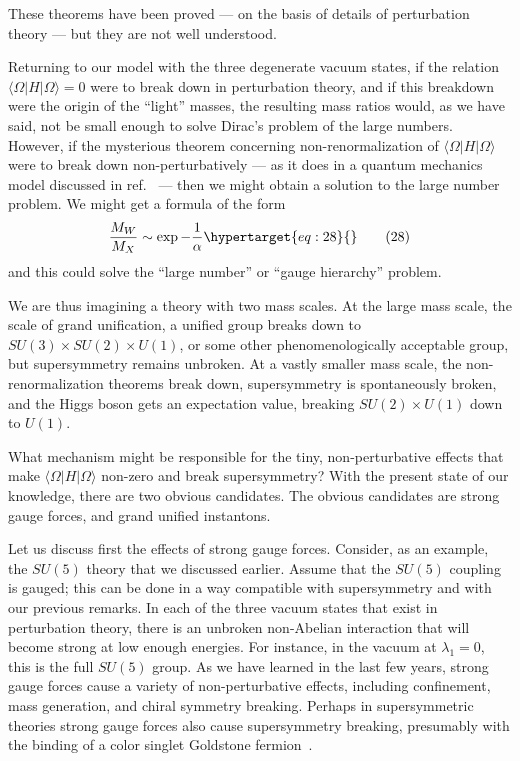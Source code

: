 \documentclass[11pt,a4paper]{article}
\newcommand{\eqtarget}[1]{\hypertarget{eq:#1}{\mathstrut}\tag{#1}}
\begin{document}
These theorems have been proved --- on the basis of details of
perturbation theory --- but they are not well understood.

Returning to our model with the three degenerate vacuum states,
if the relation $\langle \Omega| H |\Omega \rangle = 0$ were to break down in perturbation
theory, and if this breakdown were the origin of the ``light'' masses,
the resulting mass ratios would, as we have said, not be small enough
to solve Dirac's problem of the large numbers. However, if the mysterious
theorem concerning non-renormalization of $\langle \Omega| H |\Omega \rangle$ were to
break down non-perturbatively --- as it does in a quantum mechanics
model discussed in ref.~\cite{ref6} --- then we might obtain a solution to
the large number problem. We might get a formula of the form
\begin{equation}
\frac{M_W}{M_X} \sim \exp - \frac{1}{\alpha}
\eqtarget{28}
\end{equation}
and this could solve the ``large number'' or ``gauge hierarchy'' problem.

We are thus imagining a theory with two mass scales. At the
large mass scale, the scale of grand unification, a unified group
breaks down to $SU(3) \times SU(2) \times U(1)$, or some other phenomenologically
acceptable group, but supersymmetry remains unbroken. At a vastly
smaller mass scale, the non-renormalization theorems break down,
supersymmetry is spontaneously broken, and the Higgs boson gets an
expectation value, breaking $SU(2) \times U(1)$ down to $U(1)$.

What mechanism might be responsible for the tiny, non-perturbative
effects that make $\langle \Omega| H |\Omega \rangle$ non-zero and break supersymmetry?
With the present state of our knowledge, there are two obvious candidates.
The obvious candidates are strong gauge forces, and grand
unified instantons.

Let us discuss first the effects of strong gauge forces. Consider,
as an example, the $SU(5)$ theory that we discussed earlier.
Assume that the $SU(5)$ coupling is gauged; this can be done in a way
compatible with supersymmetry and with our previous remarks. In each
of the three vacuum states that exist in perturbation theory, there
is an unbroken non-Abelian interaction that will become strong at low
enough energies. For instance, in the vacuum at $\lambda_1 = 0$, this is the
full $SU(5)$ group. As we have learned in the last few years, strong
gauge forces cause a variety of non-perturbative effects, including
confinement, mass generation, and chiral symmetry breaking. Perhaps
in supersymmetric theories strong gauge forces also cause supersymmetry
breaking, presumably with the binding of a color singlet
Goldstone fermion~\cite{ref6,ref11}.
\end{document}
